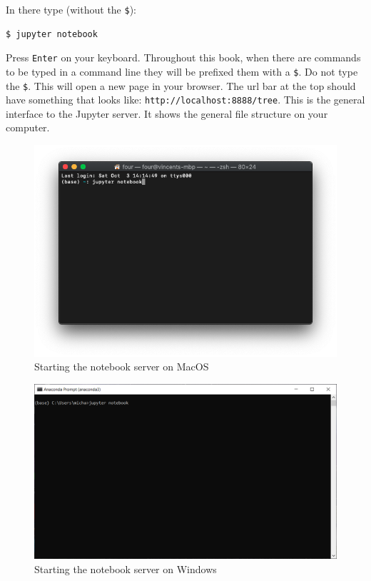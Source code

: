 In there type (without the \texttt{\$}):

\begin{verbatim}
$ jupyter notebook
\end{verbatim}

Press \texttt{Enter} on your keyboard.
Throughout this book, when there are commands to be typed in a command line
they will be prefixed them with a \texttt{\$}. Do not type the \texttt{\$}.
This will open a new page in your browser. The url bar at the top should have
something that looks like: \texttt{http://localhost:8888/tree}.
This is the general interface to the Jupyter server. It shows the general file
structure on your computer.

\begin{figure}[htbp]
\centering

    \includegraphics[width=0.750\linewidth]{assets/starting_the_notebook_server/main.png}
    \caption{Starting the notebook server on
    MacOS}\label{fig:starting-the-notebook-server}
\end{figure}

\begin{figure}[htbp]
\centering

    \includegraphics[width=0.750\linewidth]{assets/starting_the_notebook_server_windows/main.png}
    \caption{Starting the notebook server on
    Windows}\label{fig:starting-the-notebook-server-windows}
\end{figure}

